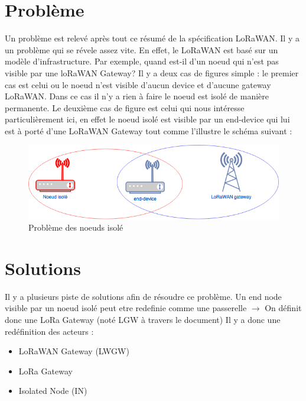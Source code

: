 \documentclass[11pt]{article}
\begin{document}
\newpage
\section{Problème}
Un problème est relevé après tout ce résumé de la spécification LoRaWAN. Il y a un problème qui se révele assez vite. En effet, le LoRaWAN est basé sur un modèle d'infrastructure. Par exemple, quand est-il d'un noeud qui n'est pas visible par une loRaWAN Gateway? Il y a deux cas de figures simple : le premier cas est celui  ou le noeud n'est visible d'aucun device et d'aucune gateway LoRaWAN. Dans ce cas il n'y a rien à faire le noeud est isolé de manière permanente. Le deuxième cas de figure est celui qui nous intéresse particulièrement ici, en effet le noeud isolé est visible par un end-device qui lui est à porté d'une LoRaWAN Gateway tout comme l'illustre le schéma suivant :


\begin{figure}[h!]
\centering
\includegraphics[scale=0.6]{probleme.png} 
\caption{Problème des noeuds isolé}
\end{figure}

\newpage
\section{Solutions}
Il y a  plusieurs piste de solutions afin de résoudre ce problème. Un end node visible par un noeud isolé peut etre redefinie comme une passerelle $\rightarrow$ On définit donc une LoRa Gateway (noté LGW à travers le document)
Il y a donc une redéfinition des acteurs :
\begin{itemize}
\item LoRaWAN Gateway (LWGW)
\item LoRa Gateway 
\item Isolated Node (IN)
\end{itemize}
\end{document}

